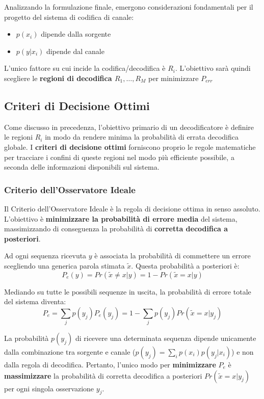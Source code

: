 Analizzando la formulazione finale, emergono considerazioni fondamentali per il progetto del sistema di codifica di canale:
\begin{itemize}
    \item $p(x_i)$ dipende dalla sorgente
    \item $p(y|x_i)$ dipende dal canale
\end{itemize}
L'unico fattore su cui incide la codifica/decodifica è $R_i$. L'obiettivo sarà quindi scegliere le \textbf{regioni di decodifica $R_1, \dots, R_M$} per minimizzare $P_{err}$





\subsection{Criteri di Decisione Ottimi}
Come discusso in precedenza, l'obiettivo primario di un decodificatore è definire le regioni $R_i$ in modo da rendere minima la probabilità di errata decodifica globale. I \textbf{criteri di decisione ottimi} forniscono proprio le regole matematiche per tracciare i confini di queste regioni nel modo più efficiente possibile, a seconda delle informazioni disponibili sul sistema.

\subsubsection{Criterio dell'Osservatore Ideale}
Il Criterio dell'Osservatore Ideale è la regola di decisione ottima in senso assoluto. 
L'obiettivo è \textbf{minimizzare la probabilità di errore media} del sistema, massimizzando di conseguenza la probabilità di \textbf{corretta decodifica a posteriori}.

Ad ogni sequenza ricevuta $y$ è associata la probabilità di commettere un errore scegliendo una generica parola stimata $\tilde{x}$. Questa probabilità a posteriori è:
\[ P_e(y) = Pr(\tilde{x} \neq x | y) = 1 - Pr(\tilde{x} = x | y) \]

Mediando su tutte le possibili sequenze in uscita, la probabilità di errore totale del sistema diventa:
\[ P_e = \sum_j p(y_j) P_e(y_j) = 1 - \sum_j p(y_j) Pr(\tilde{x} = x | y_j) \]

La probabilità $p(y_j)$ di ricevere una determinata sequenza dipende unicamente dalla combinazione tra sorgente e canale ($p(y_j) = \sum_i p(x_i)p(y_j|x_i)$) e non dalla regola di decodifica. Pertanto, l'unico modo per \textbf{minimizzare} $P_e$ è \textbf{massimizzare} la probabilità di corretta decodifica a posteriori $Pr(\tilde{x} = x | y_j)$ per ogni singola osservazione $y_j$.


